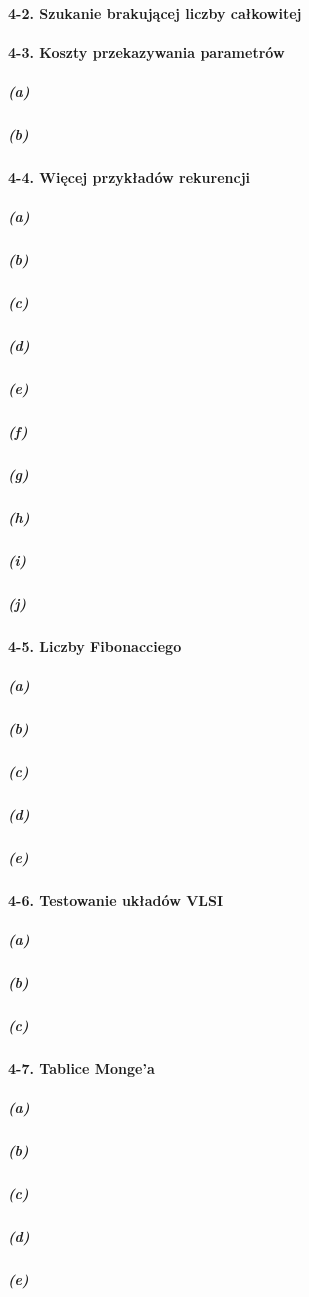 \paragraph{4-2. Szukanie brakującej liczby całkowitej}

\paragraph{4-3. Koszty przekazywania parametrów}

\subparagraph{(a)}
\subparagraph{(b)}

\paragraph{4-4. Więcej przykładów rekurencji}

\subparagraph{(a)}
\subparagraph{(b)}
\subparagraph{(c)}
\subparagraph{(d)}
\subparagraph{(e)}
\subparagraph{(f)}
\subparagraph{(g)}
\subparagraph{(h)}
\subparagraph{(i)}
\subparagraph{(j)}

\paragraph{4-5. Liczby Fibonacciego}

\subparagraph{(a)}
\subparagraph{(b)}
\subparagraph{(c)}
\subparagraph{(d)}
\subparagraph{(e)}

\paragraph{4-6. Testowanie układów VLSI}

\subparagraph{(a)}
\subparagraph{(b)}
\subparagraph{(c)}

\paragraph{4-7. Tablice Monge'a}

\subparagraph{(a)}
\subparagraph{(b)}
\subparagraph{(c)}
\subparagraph{(d)}
\subparagraph{(e)}

